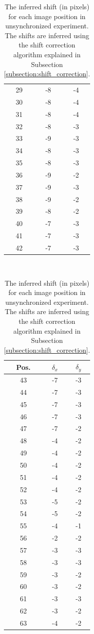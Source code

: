 \documentclass[pdftex,12pt,a4paper]{report}
\begin{document}
\begin{appendices}
\begin{table}[H]
\begin{tabular}[t]{ c | c | c }
29 & -8 & -4
\\
30 & -8 & -4
\\
31 & -8 & -4
\\
32 & -8 & -3
\\
33 & -9 & -3
\\
34 & -8 & -3
\\
35 & -8 & -3
\\
36 & -9 & -2
\\
37 & -9 & -3
\\
38 & -9 & -2
\\
39 & -8 & -2
\\
40 & -7 & -3
\\
41 & -7 & -3
\\
42 & -7 & -3
\end{tabular}
~
\begin{tabular}[t]{ c | c | c }
\hline
Pos. & $\delta_x$ & $\delta_y$
\\
\hline\hline
43 & -7 & -3
\\
44 & -7 & -3
\\
45 & -7 & -3
\\
46 & -7 & -3
\\
47 & -7 & -2
\\
48 & -4 & -2
\\
49 & -4 & -2
\\
50 & -4 & -2
\\
51 & -4 & -2
\\
52 & -4 & -2
\\
53 & -5 & -2
\\
54 & -5 & -2
\\
55 & -4 & -1
\\
56 & -2 & -2
\\
57 & -3 & -3
\\
58 & -3 & -3
\\
59 & -3 & -2
\\
60 & -3 & -2
\\
61 & -3 & -3
\\
62 & -3 & -2
\\
63 & -4 & -2
\end{tabular}
\caption[The inferred shift (in pixels) for each image position in unsynchronized experiment]{The inferred shift (in pixels) for each image position in unsynchronized experiment. The shifts are inferred using the shift correction algorithm explained in Subsection \ref{subsection:shift_correction}.}
\label{table:inferred_shift}
\end{table}


\end{appendices}
\end{document}
